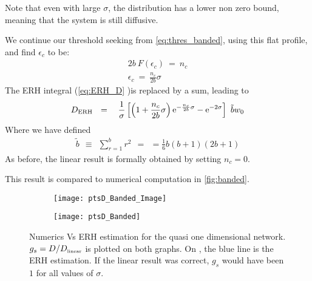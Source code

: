 Note that even with large $\sigma$, the distribution has a lower non zero bound, meaning that the system is still diffusive.


We continue our threshold seeking from \autoref{eq:thres_banded}, using this 
flat profile, and find $\epsilon_c$ to be:
%
\begin{align}
2b\ F(\epsilon_c) \ =\ n_c \\
\epsilon_c\ = \ \frac{n_c}{2b}\sigma
\end{align}
%
The ERH integral (\autoref{eq:ERH_D} )is replaced by a sum, leading to
\begin{align}
D_{\text{ERH}} \ \ = \ \ 
\ \frac{1}{\sigma}\left[ 
\left(1+\frac{n_c}{2b}\sigma\right)\eexp{-\frac{n_c}{2b}\sigma} - \eexp{-2\sigma}
\right] \ \tilde{b} w_0
\end{align}
Where we have defined
%
\begin{align}
\tilde{b} \ \ \equiv \ \ \sum_{r=1}^b r^2 \ \ = \ \ = \frac{1}{6}b(b+1)(2b+1)
\end{align}
%
As before, the linear result is formally obtained by setting $n_c=0$.

This result is compared to numerical computation in \autoref{fig:banded}.

\begin{figure}
\begin{subfigure}{0.49\textwidth}
\texttt{[image: ptsD\_Banded\_Image]}
\label{fig:band_image}
\end{subfigure}
\begin{subfigure}{0.49\textwidth}
\texttt{[image: ptsD\_Banded]}
\label{fig:band_b10}
\end{subfigure}
\caption[Banded network]{Numerics Vs ERH estimation for the quasi one dimensional network. $g_s = D/D_{\mbox{\tiny linear}}$ is plotted on both graphs.
On \subref{fig:band_b10}, the blue line is the ERH estimation. If the
linear result was correct, $g_s$ would have been $1$ for all values of $\sigma$.}
\label{fig:banded}
\end{figure}
